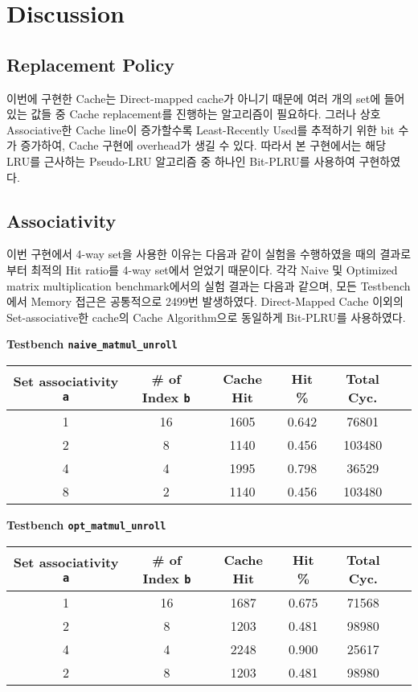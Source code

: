 \documentclass{scrartcl}
\begin{document}
\section{Discussion}
\subsection{Replacement Policy}
이번에 구현한 Cache는 Direct-mapped cache가 아니기 때문에 여러 개의 set에 들어있는 값들 중 Cache replacement를 진행하는 알고리즘이 필요하다.
그러나 상호 Associative한 Cache line이 증가할수록 Least-Recently Used를 추적하기 위한 bit 수가 증가하여, Cache 구현에 overhead가 생길 수 있다.
따라서 본 구현에서는 해당 LRU를 근사하는 Pseudo-LRU 알고리즘 중 하나인 Bit-PLRU를 사용하여 구현하였다.

\subsection{Associativity}
이번 구현에서 4-way set을 사용한 이유는 다음과 같이 실험을 수행하였을 때의 결과로부터 최적의 Hit ratio를 4-way set에서 얻었기 때문이다.
각각 Naive 및 Optimized matrix multiplication benchmark에서의 실험 결과는 다음과 같으며, 모든 Testbench에서 Memory 접근은 공통적으로 2499번 발생하였다.
Direct-Mapped Cache 이외의 Set-associative한 cache의 Cache Algorithm으로 동일하게 Bit-PLRU를 사용하였다.

\begin{center}
  \textbf{Testbench \texttt{naive\_matmul\_unroll}}
  \begin{tabular}{|c | c | c | c | c | c|}
    \hline
    Set associativity \texttt{a} & \# of Index \texttt{b} & Cache Hit & Hit \% & Total Cyc. \\ \hline
    1 & 16 & 1605 & 0.642 & 76801 \\ \hline
    2 & 8 & 1140 & 0.456 & 103480 \\ \hline
    4 & 4 & 1995 & 0.798 & 36529 \\ \hline
    8 & 2 & 1140 & 0.456 & 103480 \\ \hline
  \end{tabular}

  \textbf{Testbench \texttt{opt\_matmul\_unroll}}
  \begin{tabular}{|c | c | c | c | c | c|}
    \hline
    Set associativity \texttt{a} & \# of Index \texttt{b} & Cache Hit & Hit \% & Total Cyc. \\ \hline
    1 & 16 & 1687 & 0.675 & 71568 \\ \hline
    2 & 8 & 1203 & 0.481 & 98980 \\ \hline
    4 & 4 & 2248 & 0.900 & 25617 \\ \hline
    2 & 8 & 1203 & 0.481 & 98980 \\ \hline
  \end{tabular}
\end{center}
\end{document}

